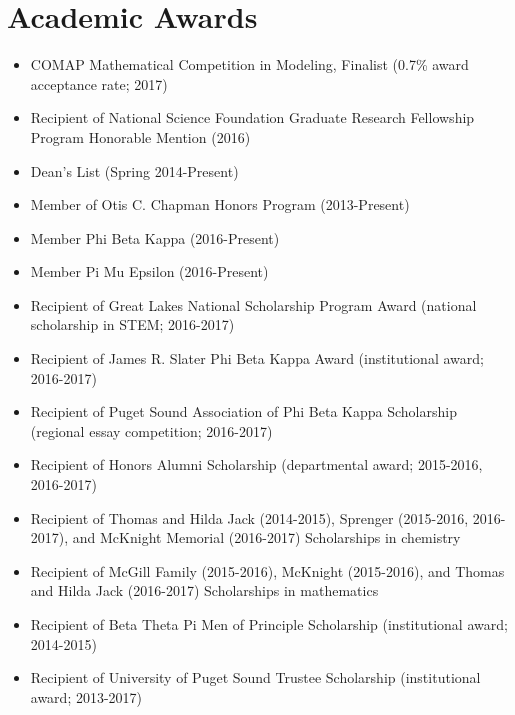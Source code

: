 \section{Academic Awards}
 \begin{itemize}
 \item COMAP Mathematical Competition in Modeling, Finalist (0.7\% award acceptance rate; 2017)
 \item Recipient of National Science Foundation Graduate Research Fellowship Program Honorable Mention (2016)
 \item Dean's List (Spring 2014-Present)
 \item Member of Otis C. Chapman Honors Program (2013-Present)
 \item Member Phi Beta Kappa (2016-Present)
 \item Member Pi Mu Epsilon (2016-Present)
 \item Recipient of Great Lakes National Scholarship Program Award (national scholarship in STEM; 2016-2017)
 \item Recipient of James R. Slater Phi Beta Kappa Award (institutional award; 2016-2017)
 \item Recipient of Puget Sound Association of Phi Beta Kappa Scholarship (regional essay competition; 2016-2017)
 \item Recipient of Honors Alumni Scholarship (departmental award; 2015-2016, 2016-2017)
 \item Recipient of Thomas and Hilda Jack (2014-2015), Sprenger (2015-2016, 2016-2017), and McKnight Memorial (2016-2017) Scholarships in chemistry
 \item Recipient of McGill Family (2015-2016), McKnight (2015-2016), and Thomas and Hilda Jack (2016-2017) Scholarships in mathematics
 \item Recipient of Beta Theta Pi Men of Principle Scholarship (institutional award; 2014-2015)
 \item Recipient of University of Puget Sound Trustee Scholarship (institutional award; 2013-2017)
 \end{itemize}
\vspace{-3.5mm}
